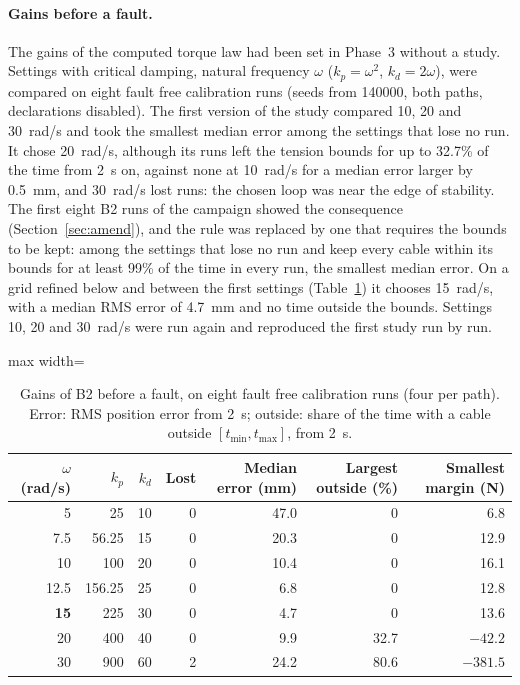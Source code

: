 \documentclass[10pt]{article}
\begin{document}
\paragraph{Gains before a fault.} The gains of the computed torque law had been set in Phase~3 without a study. Settings with critical damping, natural frequency $\omega$ ($k_p=\omega^2$, $k_d=2\omega$), were compared on eight fault free calibration runs (seeds from 140000, both paths, declarations disabled). The first version of the study compared 10, 20 and 30~rad/s and took the smallest median error among the settings that lose no run. It chose 20~rad/s, although its runs left the tension bounds for up to 32.7\% of the time from 2~s on, against none at 10~rad/s for a median error larger by 0.5~mm, and 30~rad/s lost runs: the chosen loop was near the edge of stability. The first eight B2 runs of the campaign showed the consequence (Section~\ref{sec:amend}), and the rule was replaced by one that requires the bounds to be kept: among the settings that lose no run and keep every cable within its bounds for at least 99\% of the time in every run, the smallest median error. On a grid refined below and between the first settings (Table~\ref{tab:b2gains}) it chooses 15~rad/s, with a median RMS error of 4.7~mm and no time outside the bounds. Settings 10, 20 and 30~rad/s were run again and reproduced the first study run by run.

\begin{table}[h]
\centering\small
\caption{Gains of B2 before a fault, on eight fault free calibration runs (four per path). Error: RMS position error from 2~s; outside: share of the time with a cable outside $[t_{\min},t_{\max}]$, from 2~s.}\label{tab:b2gains}
\begin{adjustbox}{max width=\linewidth}\begin{tabular}{@{}rrrrrrr@{}}
\toprule
$\omega$ (rad/s) & $k_p$ & $k_d$ & Lost & Median error (mm) & Largest outside (\%) & Smallest margin (N) \\
\midrule
5 & 25 & 10 & 0 & 47.0 & 0 & 6.8 \\
7.5 & 56.25 & 15 & 0 & 20.3 & 0 & 12.9 \\
10 & 100 & 20 & 0 & 10.4 & 0 & 16.1 \\
12.5 & 156.25 & 25 & 0 & 6.8 & 0 & 12.8 \\
\textbf{15} & 225 & 30 & 0 & 4.7 & 0 & 13.6 \\
20 & 400 & 40 & 0 & 9.9 & 32.7 & $-42.2$ \\
30 & 900 & 60 & 2 & 24.2 & 80.6 & $-381.5$ \\
\bottomrule
\end{tabular}\end{adjustbox}
\end{table}
\end{document}
